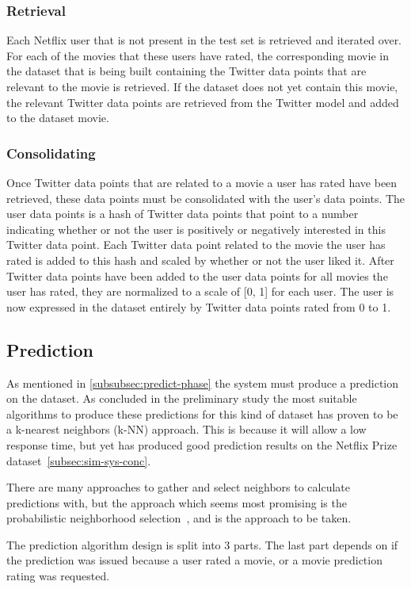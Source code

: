 \subsubsection{Retrieval}
    Each Netflix user that is not present in the test set is retrieved and iterated over.
    For each of the movies that these users have rated, the corresponding movie in the dataset that is being built containing the Twitter data points that are relevant to the movie is retrieved.
    If the dataset does not yet contain this movie, the relevant Twitter data points are retrieved from the Twitter model and added to the dataset movie.

\subsubsection{Consolidating}
	Once Twitter data points that are related to a movie a user has rated have been retrieved, these data points must be consolidated with the user's data points. The user data points is a hash of Twitter data points that point to a number indicating whether or not the user is positively or negatively interested in this Twitter data point. Each Twitter data point related to the movie the user has rated is added to this hash and scaled by whether or not the user liked it. After Twitter data points have been added to the user data points for all movies the user has rated, they are normalized to a scale of [0, 1] for each user. The user is now expressed in the dataset entirely by Twitter data points rated from 0 to 1.

\subsection{Prediction}\label{algorithm-design:prediction}
As mentioned in \ref{subsubsec:predict-phase} the system must produce a prediction on the dataset. As concluded in the preliminary study the most suitable algorithms to produce these predictions for this kind of dataset has proven to be a k-nearest neighbors (k-NN) approach. This is because it will allow a low response time, but yet has produced good prediction results on the Netflix Prize dataset~\ref{subsec:sim-sys-conc}.

There are many approaches to gather and select neighbors to calculate predictions with, but the approach which seems most promising is the probabilistic neighborhood selection~\cite{probcobfilter}, and is the approach to be taken.

The prediction algorithm design is split into 3 parts. The last part depends on if the prediction was issued because a user rated a movie, or a movie prediction rating was requested.

